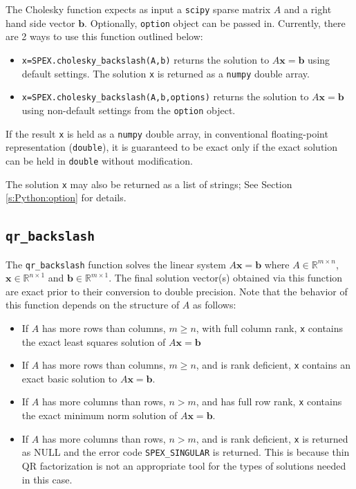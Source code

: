 \documentclass[12pt,oneside]{book}
\theoremstyle{definition}
\renewcommand{\b}{\mathbf{b}}
\newcommand{\x}{\mathbf{x}}
\begin{document}
The Cholesky function expects as input a \verb|scipy| sparse matrix $A$ and a right hand side vector $\b$. Optionally, \verb|option| object can be passed in.
Currently, there are 2 ways to use this function outlined below:

\begin{itemize}
    \item \verb|x=SPEX.cholesky_backslash(A,b)| returns the solution to $A \x = \b$ using default settings. The solution \verb|x| is returned as a \verb|numpy| double array.
    \item \verb|x=SPEX.cholesky_backslash(A,b,options)| returns the solution to $A \x = \b$ using non-default settings from the \verb|option| object.
\end{itemize}

If the result \verb|x| is held as a \verb|numpy| double array, in conventional floating-point representation (\verb|double|), it is guaranteed to be exact only if the exact solution can be held in \verb|double| without modification.

The solution \verb|x| may also be returned as a list of strings; See Section \ref{s:Python:option} for details.

\subsection{\texttt{qr\_backslash}}
The \verb|qr_backslash| function solves the linear system $A\x=\b$ where $A \in \mathbb{R}^{m \times n}$, $\x \in \mathbb{R}^{n \times 1}$ and $\b \in \mathbb{R}^{m \times 1}$. The final solution vector(s) obtained via this function are exact prior to their conversion to double precision. Note that the behavior of this function depends on the structure of $A$ as follows:
\begin{itemize}
    \item If $A$ has more rows than columns, $m \geq n$, with full column rank, \verb|x| contains the exact least squares solution of $A \x = \b$
    \item If $A$ has more rows than columns, $m \geq n$, and is rank deficient, \verb|x| contains an exact basic solution to $A \x = \b$.
    \item If $A$ has more columns than rows, $n > m$, and has full row rank, \verb|x| contains the exact minimum norm solution of $A \x = \b$.
    \item If $A$ has more columns than rows, $n > m$, and is rank deficient, \verb|x| is returned as NULL and the error code \verb|SPEX_SINGULAR| is returned. This is because thin QR factorization is not an appropriate tool for the types of solutions needed in this case.
\end{itemize}
\end{document}
